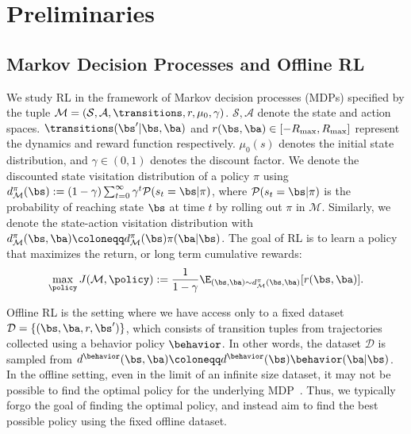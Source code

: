 \section{Preliminaries}
\label{sec:prelim}

\subsection{Markov Decision Processes and Offline RL} 

We study RL in the framework of Markov decision processes (MDPs) specified by the tuple $\mathcal{M} = (\mathcal{S}, \mathcal{A}, \transitions, r, \mu_0, \gamma)$.
$\mathcal{S}, \mathcal{A}$ denote the state and action spaces. 
$\transitions(\bs' | \bs, \ba)$ and $r(\bs,\ba) \in [-R_{\max}, R_{\max}]$ represent the dynamics and reward function respectively. 
$\mu_0(s)$ denotes the initial state distribution, and $\gamma \in (0,1)$ denotes the discount factor. 
We denote the discounted state visitation distribution of a policy $\pi$ using \hbox{$d_\mathcal{M}^\pi(\bs) := (1 - \gamma)\sum_{t=0}^\infty\gamma^t\mathcal{P}(s_t = \bs | \pi)$}, where $\mathcal{P}(s_t = \bs | \pi)$ is the probability of reaching state $\bs$ at time $t$ by rolling out $\pi$ in $\mathcal{M}$. Similarly, we denote the state-action visitation distribution with $d_\mathcal{M}^\pi(\bs, \ba) \coloneqq d_\mathcal{M}^\pi(\bs)\pi(\ba|\bs)$. The goal of RL is to learn a policy that maximizes the return, or long term cumulative rewards:
\begin{equation}
    \max_\policy J(\mathcal{M}, \policy) := \frac{1}{1-\gamma}\E_{(\bs, \ba) \sim d_\mathcal{M}^\pi(\bs, \ba)}[r(\bs, \ba)].
\end{equation}


Offline RL is the setting where we have access only to a fixed dataset $\mathcal{D} = \{(\bs, \ba, r, \bs')\}$, which consists of transition tuples from trajectories collected using a behavior policy $\behavior$. In other words, the dataset $\mathcal{D}$ is sampled from $d^\behavior(\bs, \ba) \coloneqq d^\behavior(\bs) \behavior(\ba|\bs)$. In the offline setting, even in the limit of an infinite size dataset, it may not be possible to find the optimal policy for the underlying MDP~\cite{Chen2019InformationTheoreticCI, kidambi2020morel}.
Thus, we typically forgo the goal of finding the optimal policy, and instead aim to find the best possible policy using the fixed offline dataset.

